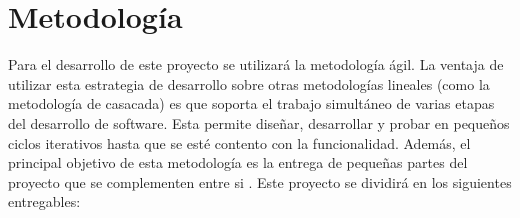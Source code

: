 \section{Metodología}







Para el desarrollo de este proyecto se utilizará la metodología ágil. La ventaja de utilizar esta estrategia de desarrollo sobre otras metodologías lineales (como la metodología de casacada) es que soporta el trabajo simultáneo de varias etapas del desarrollo de software. Esta permite diseñar, desarrollar y probar en pequeños ciclos iterativos hasta que se esté contento con la funcionalidad. Además, el principal objetivo de esta metodología es la entrega de pequeñas partes del proyecto que se complementen entre si \cite{what_is_agile_meth}. Este proyecto se dividirá en los siguientes entregables:

